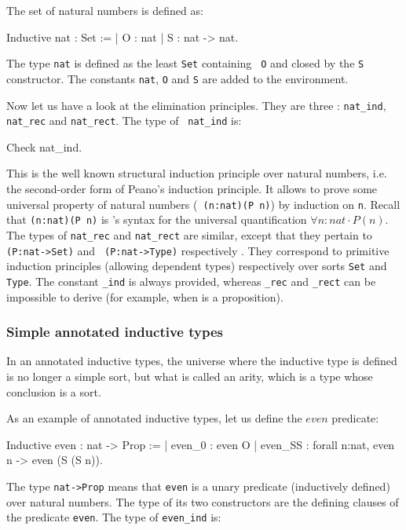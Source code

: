 The set of natural numbers is defined as:
\begin{coq_example}
Inductive nat : Set :=
  | O : nat
  | S : nat -> nat.
\end{coq_example}

The type {\tt nat} is defined as the least \verb:Set: containing {\tt
  O} and closed by the {\tt S} constructor. The constants {\tt nat},
{\tt O} and {\tt S} are added to the environment.

Now let us have a look at the elimination principles. They are three :
{\tt nat\_ind}, {\tt nat\_rec} and {\tt nat\_rect}.  The type of {\tt
  nat\_ind} is:
\begin{coq_example}
Check nat_ind.
\end{coq_example}

This is the well known structural induction principle over natural
numbers, i.e. the second-order form of Peano's induction principle.
It allows to prove some universal property of natural numbers ({\tt
(n:nat)(P n)}) by induction on {\tt n}. Recall that {\tt (n:nat)(P n)}
is \gallina's syntax for the universal quantification $\forall
n:nat\cdot P(n).$\\ The types of {\tt nat\_rec} and {\tt nat\_rect}
are similar, except that they pertain to {\tt (P:nat->Set)} and {\tt
(P:nat->Type)} respectively . They correspond to primitive induction
principles (allowing dependent types) respectively over sorts
\verb:Set: and \verb:Type:. The constant {\ident}{\tt \_ind} is always
provided, whereas {\ident}{\tt \_rec} and {\ident}{\tt \_rect} can be
impossible to derive (for example, when {\ident} is a proposition).

\subsubsection{Simple annotated inductive types}

In an annotated inductive types, the universe where the inductive
type is defined is no longer a simple sort, but what is called an
arity, which is a type whose conclusion is a sort.

As an example of annotated inductive types, let us define the
$even$ predicate:

\begin{coq_example}
Inductive even : nat -> Prop :=
  | even_0 : even O
  | even_SS : forall n:nat, even n -> even (S (S n)).
\end{coq_example}

The type {\tt nat->Prop} means that {\tt even} is a unary predicate
(inductively defined) over natural numbers.  The type of its two
constructors are the defining clauses of the predicate {\tt even}. The
type of {\tt even\_ind} is:


